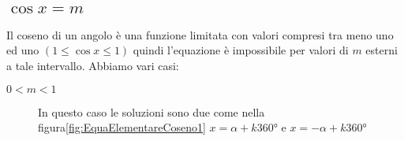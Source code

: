 \subsection{$\cos x=m$}
Il coseno di un angolo è una funzione limitata con valori compresi tra meno uno ed uno $(1\leq\cos x\leq 1)$ quindi l'equazione è impossibile per valori di $m$ esterni a tale intervallo. Abbiamo vari casi:
\begin{description}
	\item[$0<m<1$] In questo caso le soluzioni sono due come nella figura\nobs\vref{fig:EquaElementareCoseno1} $x=\alpha+k\ang{360}$ e $x=-\alpha+k\ang{360}$
\end{description} 
\begin{figure}
	\centering
 	
		\label{fig:EquaElementareCoseno1}
\end{figure}